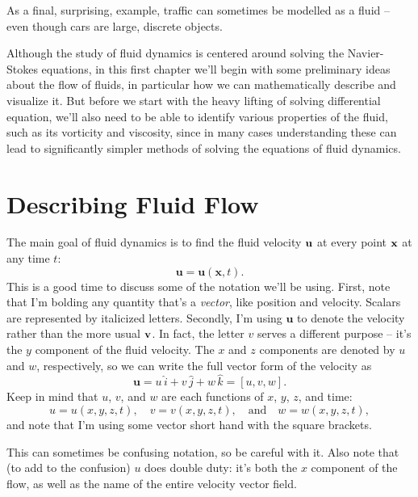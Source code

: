 As a final, surprising, example, traffic can sometimes be modelled as a fluid -- even though cars are large, discrete objects.

Although the study of fluid dynamics is centered around solving the Navier-Stokes equations, in this first chapter we'll begin with some preliminary ideas about the flow of fluids, in particular how we can mathematically describe and visualize it.  But before we start with the heavy lifting of solving differential equation, we'll also need to be able to identify various properties of the fluid, such as its vorticity and viscosity, since in many cases understanding these can lead to significantly simpler methods of solving the equations of fluid dynamics.



\section{Describing Fluid Flow}

The main goal of fluid dynamics is to find the fluid velocity $\bf{u}$ at every point $\bf{x}$ at any time $t$:
\begin{equation}
\mathbf{u} = \mathbf{u}(\mathbf{x}, t).
\end{equation}
This is a good time to discuss some of the notation we'll be using.  First, note that I'm bolding any quantity that's a \emph{vector}, like position and velocity.  Scalars are represented by italicized letters.  Secondly, I'm using $\mathbf{u}$ to denote the velocity rather than the more usual $\bf{v}$. In fact, the letter $v$ serves a different purpose -- it's the $y$ component of the fluid velocity. The $x$ and $z$ components are denoted by $u$ and $w$, respectively, so we can write the full vector form of the velocity as
\begin{equation}
\mathbf{u} = u \, \hat{i} + v \, \hat{j} + w \, \hat{k} = [u, v, w].
\end{equation}
Keep in mind that $u$, $v$, and $w$ are each functions of $x$, $y$, $z$, and time:
\[
u = u(x, y, z, t), \quad v = v(x, y, z, t), \quad \text{and} \quad w = w(x, y, z, t),
\]
and note that I'm using some vector short hand with the square brackets.

This can sometimes be confusing notation, so be careful with it.  Also note that (to add to the confusion) $u$ does double duty: it's both the $x$ component of the flow, as well as the name of the entire velocity vector field.


